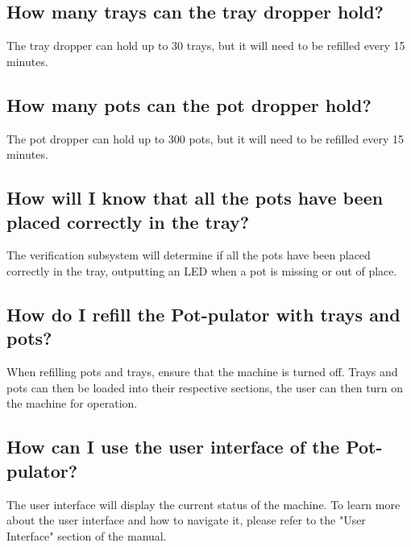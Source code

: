 \documentclass{article}
\begin{document}
\subsection{How many trays can the tray dropper hold?}
The tray dropper can hold up to 30 trays, but it will need to be refilled every 15 minutes.
\subsection{How many pots can the pot dropper hold?}
The pot dropper can hold up to 300 pots, but it will need to be refilled every 15 minutes.
\subsection{How will I know that all the pots have been placed correctly in the tray?}
The verification subsystem will determine if all the pots have been placed correctly in the tray, outputting an LED when a pot is missing or out of place.
\subsection{How do I refill the Pot-pulator with trays and pots?}
When refilling pots and trays, ensure that the machine is turned off. Trays and pots can then be loaded into their respective sections, the user can then turn on the machine for operation.
\subsection{How can I use the user interface of the Pot-pulator?}
The user interface will display the current status of the machine. To learn more about the user interface and how to navigate it, please refer to the "User Interface" section of the manual.
\end{document}
